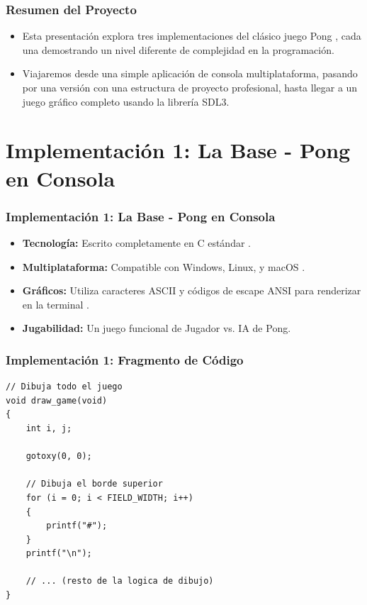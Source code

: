 \documentclass[]{beamer}
\begin{document}
\begin{frame}
  \frametitle{Resumen del Proyecto}
  \begin{itemize}
    \item Esta presentación explora tres implementaciones del clásico juego Pong \cite{wikipedia_pong}, cada una demostrando un nivel diferente de complejidad en la programación.
    \item Viajaremos desde una simple aplicación de consola multiplataforma, pasando por una versión con una estructura de proyecto profesional, hasta llegar a un juego gráfico completo usando la librería SDL3.
  \end{itemize}
\end{frame}

\section{Implementación 1: La Base - Pong en Consola}
\begin{frame}
  \frametitle{Implementación 1: La Base - Pong en Consola}
  \subtitle{\texttt{01-simple}: C Puro, Multiplataforma}
  \begin{itemize}
    \item \textbf{Tecnología:} Escrito completamente en C estándar \cite{pong_simple}.
    \item \textbf{Multiplataforma:} Compatible con Windows, Linux, y macOS \cite{pong_simple}.
    \item \textbf{Gráficos:} Utiliza caracteres ASCII y códigos de escape ANSI para renderizar en la terminal \cite{pong_simple}.
    \item \textbf{Jugabilidad:} Un juego funcional de Jugador vs. IA de Pong.
  \end{itemize}
\end{frame}

\begin{frame}[fragile]
    \frametitle{Implementación 1: Fragmento de Código}
    \lstset{style=myC++Style, language=C}
    \begin{lstlisting}[]
// Dibuja todo el juego
void draw_game(void)
{
    int i, j;

    gotoxy(0, 0);

    // Dibuja el borde superior
    for (i = 0; i < FIELD_WIDTH; i++)
    {
        printf("#");
    }
    printf("\n");

    // ... (resto de la logica de dibujo)
}
    \end{lstlisting}
\end{frame}
\end{document}
